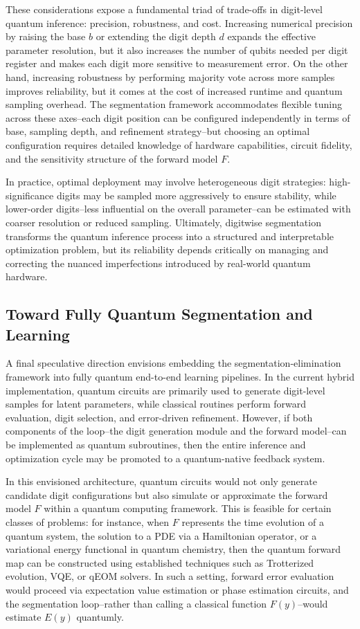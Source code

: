 \documentclass[aps,twocolumn,superscriptaddress,nofootinbib]{revtex4}
\begin{document}
These considerations expose a fundamental triad of trade-offs in digit-level quantum inference: precision, robustness, and cost. Increasing numerical precision by raising the base \( b \) or extending the digit depth $d$ expands the effective parameter resolution, but it also increases the number of qubits needed per digit register and makes each digit more sensitive to measurement error. On the other hand, increasing robustness by performing majority vote across more samples improves reliability, but it comes at the cost of increased runtime and quantum sampling overhead. The segmentation framework accommodates flexible tuning across these axes--each digit position can be configured independently in terms of base, sampling depth, and refinement strategy--but choosing an optimal configuration requires detailed knowledge of hardware capabilities, circuit fidelity, and the sensitivity structure of the forward model \( F \).

In practice, optimal deployment may involve heterogeneous digit strategies: high-significance digits may be sampled more aggressively to ensure stability, while lower-order digits--less influential on the overall parameter--can be estimated with coarser resolution or reduced sampling. Ultimately, digitwise segmentation transforms the quantum inference process into a structured and interpretable optimization problem, but its reliability depends critically on managing and correcting the nuanced imperfections introduced by real-world quantum hardware.
\subsection{Toward Fully Quantum Segmentation and Learning}
A final speculative direction envisions embedding the segmentation-elimination framework into fully quantum end-to-end learning pipelines. In the current hybrid implementation, quantum circuits are primarily used to generate digit-level samples for latent parameters, while classical routines perform forward evaluation, digit selection, and error-driven refinement. However, if both components of the loop--the digit generation module and the forward model--can be implemented as quantum subroutines, then the entire inference and optimization cycle may be promoted to a quantum-native feedback system.

In this envisioned architecture, quantum circuits would not only generate candidate digit configurations but also simulate or approximate the forward model \( F \) within a quantum computing framework. This is feasible for certain classes of problems: for instance, when \( F \) represents the time evolution of a quantum system, the solution to a PDE via a Hamiltonian operator, or a variational energy functional in quantum chemistry, then the quantum forward map can be constructed using established techniques such as Trotterized evolution, VQE, or qEOM solvers. In such a setting, forward error evaluation would proceed via expectation value estimation or phase estimation circuits, and the segmentation loop--rather than calling a classical function \( F(y) \)--would estimate \( E(y) \) quantumly.
\end{document}

